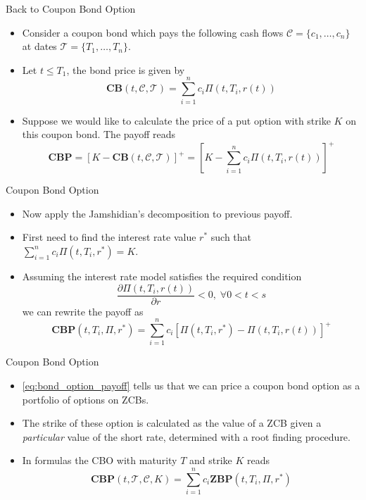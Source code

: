 \documentclass{beamer}
\begin{document}
\begin{frame}{Back to Coupon Bond Option}
\begin{itemize}
	\item<1-> Consider a coupon bond which pays the following cash flows $\mathcal{C}=\{c_1,\dots,c_n\}$ at dates $\mathcal{T}=\{T_1,\ldots,T_n\}$.
	\item<2-> Let $t\leq T_1$, the bond price is given by
	\begin{equation*}
		\textbf{CB}(t,\mathcal{C},\mathcal{T})=\sum_{i=1}^n c_i \Pi(t, T_i, r(t))
	\end{equation*}
	\item<3-> Suppose we would like to calculate the price of a put option with strike $K$ on this coupon bond. The payoff reads
	\begin{equation*}
		\textbf{CBP}=\left[K-\textbf{CB}(t,\mathcal{C},\mathcal{T})\right]^+ = \left[K-\sum_{i=1}^n c_i \Pi(t, T_i, r(t))\right]^+
	\end{equation*}
\end{itemize}
\end{frame}

\begin{frame}{Coupon Bond Option}
\begin{itemize}
	\item<1-> Now apply the Jamshidian's decomposition to previous payoff.
	\item<2-> First need to find the interest rate value $r^*$ such that $\sum_{i=1}^n c_i \Pi(t, T_i, r^*) = K$.
	\item<3-> Assuming the interest rate model satisfies the required condition
	\begin{equation*}
		\frac{\partial \Pi(t,T_i,r(t))}{\partial r}<0,\;\forall 0<t<s
	\end{equation*}
	we can rewrite the payoff as
	\begin{equation}
		\textbf{CBP}(t,T_i,\Pi,r^*) = \sum_{i=1}^n c_i [\Pi(t, T_i, r^*)-\Pi(t, T_i, r(t))]^+
	\label{eq:bond_option_payoff}
	\end{equation}
\end{itemize}
\end{frame}

\begin{frame}{Coupon Bond Option}
\begin{itemize}
	\item \cref{eq:bond_option_payoff} tells us that we can price a coupon bond option as a portfolio of options on ZCBs.
	\item The strike of these option is calculated as the value of a ZCB given a \emph{particular} value of the short rate, determined with a root finding procedure.
	\item In formulas the CBO with maturity $T$ and strike $K$ reads
	\begin{equation}
		\boxed{\textbf{CBP}(t,\mathcal{T},\mathcal{C},K) = \sum_{i=1}^n c_i \textbf{ZBP}(t,T_i,\Pi,r^*)}
	\end{equation}
\end{itemize}
\end{frame}
\end{document}
